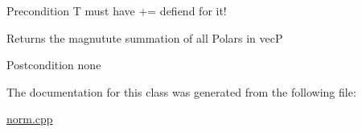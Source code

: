 \begin{DoxyPrecond}{Precondition}
T must have \textquotesingle{}+=\textquotesingle{} defiend for it! 
\end{DoxyPrecond}
\begin{DoxyReturn}{Returns}
the magnutute summation of all Polars in vecP 
\end{DoxyReturn}
\begin{DoxyPostcond}{Postcondition}
none 
\end{DoxyPostcond}


The documentation for this class was generated from the following file\+:\begin{DoxyCompactItemize}
\item 
\hyperlink{norm_8cpp}{norm.\+cpp}\end{DoxyCompactItemize}

